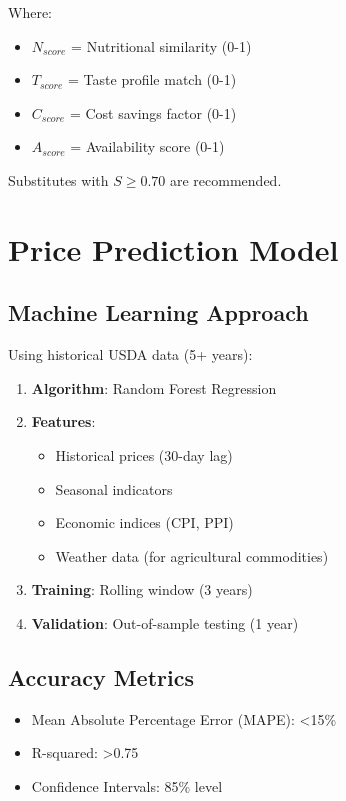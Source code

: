 \documentclass[11pt,a4paper]{article}
\begin{document}
Where:
\begin{itemize}
    \item $N_{score}$ = Nutritional similarity (0-1)
    \item $T_{score}$ = Taste profile match (0-1)
    \item $C_{score}$ = Cost savings factor (0-1)
    \item $A_{score}$ = Availability score (0-1)
\end{itemize}

Substitutes with $S \geq 0.70$ are recommended.

\section{Price Prediction Model}

\subsection{Machine Learning Approach}
Using historical USDA data (5+ years):

\begin{enumerate}
    \item \textbf{Algorithm}: Random Forest Regression
    \item \textbf{Features}: 
    \begin{itemize}
        \item Historical prices (30-day lag)
        \item Seasonal indicators
        \item Economic indices (CPI, PPI)
        \item Weather data (for agricultural commodities)
    \end{itemize}
    \item \textbf{Training}: Rolling window (3 years)
    \item \textbf{Validation}: Out-of-sample testing (1 year)
\end{enumerate}

\subsection{Accuracy Metrics}
\begin{itemize}
    \item Mean Absolute Percentage Error (MAPE): <15\%
    \item R-squared: >0.75
    \item Confidence Intervals: 85\% level
\end{itemize}
\end{document}
